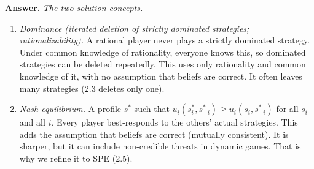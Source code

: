 \documentclass[11pt]{article}
\newenvironment{solution}{\par\smallskip\noindent\textbf{Answer.} }{\par\medskip}
\begin{document}
\begin{description}
\begin{solution}
\emph{The two solution concepts.}
\begin{enumerate}[itemsep=0pt]
\item \emph{Dominance (iterated deletion of strictly dominated strategies; rationalizability).} A rational player never plays a strictly dominated strategy. Under common knowledge of rationality, everyone knows this, so dominated strategies can be deleted repeatedly. This uses only rationality and common knowledge of it, with no assumption that beliefs are correct. It often leaves many strategies (2.3 deletes only one).
\item \emph{Nash equilibrium.} A profile $s^*$ such that $u_i(s_i^*,s_{-i}^*)\ge u_i(s_i,s_{-i}^*)$ for all $s_i$ and all $i$. Every player best-responds to the others' actual strategies. This adds the assumption that beliefs are correct (mutually consistent). It is sharper, but it can include non-credible threats in dynamic games. That is why we refine it to SPE (2.5).
\end{enumerate}
\end{solution}


\end{description}
\end{document}
